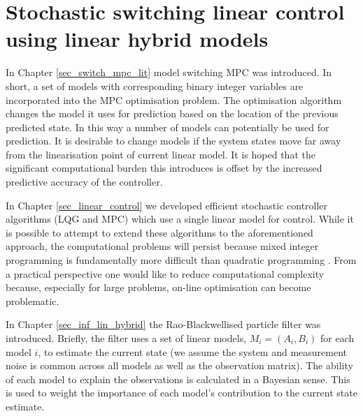 \chapter{Stochastic switching linear control using linear hybrid models}
\label{sec_rbpf_control}
In Chapter \ref{sec_switch_mpc_lit} model switching MPC was introduced. In short, a set of models with corresponding binary integer variables are incorporated into the MPC optimisation problem. The optimisation algorithm changes the model it uses for prediction based on the location of the previous predicted state. In this way a number of models can potentially be used for prediction. It is desirable to change models if the system states move far away from the linearisation point of current linear model. It is hoped that the significant computational burden this introduces is offset by the increased predictive accuracy of the controller.

In Chapter \ref{sec_linear_control} we developed efficient stochastic controller algorithms (LQG and MPC) which use a single linear model for control. While it is possible to attempt to extend these algorithms to the aforementioned approach, the computational problems will persist because mixed integer programming is fundamentally more difficult than quadratic programming \cite{forst}. From a practical perspective one would like to reduce computational complexity because, especially for large problems, on-line optimisation can become problematic.

In Chapter \ref{sec_inf_lin_hybrid} the Rao-Blackwellised particle filter was introduced. Briefly, the filter uses a set of linear models, $M_i=(A_i, B_i)$ for each model $i$, to estimate the current state (we assume the system and measurement noise is common across all models as well as the observation matrix). The ability of each model to explain the observations is calculated in a Bayesian sense. This is used to weight the importance of each model's contribution to the current state estimate. 

